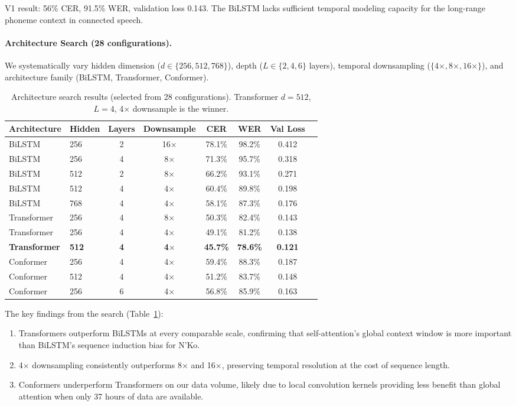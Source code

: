 \documentclass[11pt]{article}
\begin{document}
V1 result: 56\% CER, 91.5\% WER, validation loss 0.143.
The BiLSTM lacks sufficient temporal modeling capacity for the long-range phoneme context in connected speech.

\paragraph{Architecture Search (28 configurations).}
We systematically vary hidden dimension ($d \in \{256, 512, 768\}$), depth ($L \in \{2, 4, 6\}$ layers), temporal downsampling ($\{4\times, 8\times, 16\times\}$), and architecture family (BiLSTM, Transformer, Conformer).

\begin{table}[t]
\centering
\small
\begin{tabular}{llcccccc}
\toprule
\textbf{Architecture} & \textbf{Hidden} & \textbf{Layers} & \textbf{Downsample} & \textbf{CER} & \textbf{WER} & \textbf{Val Loss} \\
\midrule
BiLSTM & 256 & 2 & 16$\times$ & 78.1\% & 98.2\% & 0.412 \\
BiLSTM & 256 & 4 & 8$\times$ & 71.3\% & 95.7\% & 0.318 \\
BiLSTM & 512 & 2 & 8$\times$ & 66.2\% & 93.1\% & 0.271 \\
BiLSTM & 512 & 4 & 4$\times$ & 60.4\% & 89.8\% & 0.198 \\
BiLSTM & 768 & 4 & 4$\times$ & 58.1\% & 87.3\% & 0.176 \\
Transformer & 256 & 4 & 8$\times$ & 50.3\% & 82.4\% & 0.143 \\
Transformer & 256 & 4 & 4$\times$ & 49.1\% & 81.2\% & 0.138 \\
\textbf{Transformer} & \textbf{512} & \textbf{4} & \textbf{4$\times$} & \textbf{45.7\%} & \textbf{78.6\%} & \textbf{0.121} \\
Conformer & 256 & 4 & 4$\times$ & 59.4\% & 88.3\% & 0.187 \\
Conformer & 512 & 4 & 4$\times$ & 51.2\% & 83.7\% & 0.148 \\
Conformer & 256 & 6 & 4$\times$ & 56.8\% & 85.9\% & 0.163 \\
\bottomrule
\end{tabular}
\caption{Architecture search results (selected from 28 configurations). Transformer $d{=}512$, $L{=}4$, 4$\times$ downsample is the winner.}
\label{tab:arch-search}
\end{table}

The key findings from the search (Table~\ref{tab:arch-search}):
\begin{enumerate}
\item Transformers outperform BiLSTMs at every comparable scale, confirming that self-attention's global context window is more important than BiLSTM's sequence induction bias for N'Ko.
\item 4$\times$ downsampling consistently outperforms 8$\times$ and 16$\times$, preserving temporal resolution at the cost of sequence length.
\item Conformers underperform Transformers on our data volume, likely due to local convolution kernels providing less benefit than global attention when only 37 hours of data are available.
\end{enumerate}
\end{document}
